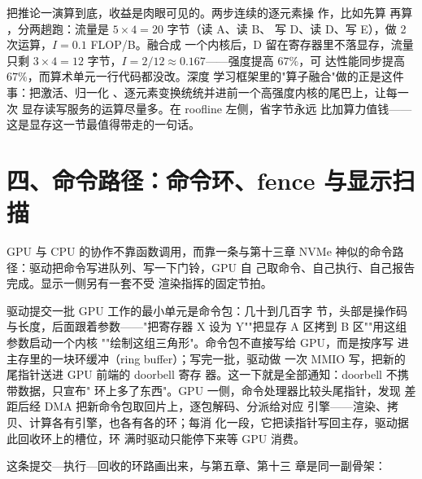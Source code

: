 把推论一演算到底，收益是肉眼可见的。两步连续的逐元素操
作，比如先算  再算 ，分两趟跑：流量是 $5\times4=20$ 字节（读 A、读 B、
写 D、读 D、写 E），做 2 次运算，$I=0.1$ FLOP/B。融合成
一个内核后，D 留在寄存器里不落显存，流量只剩 $3\times4
=12$ 字节，$I=2/12\approx0.167$——强度提高 $67\%$，可
达性能同步提高 $67\%$，而算术单元一行代码都没改。深度
学习框架里的"算子融合"做的正是这件事：把激活、归一化
、逐元素变换统统并进前一个高强度内核的尾巴上，让每一次
显存读写服务的运算尽量多。在 roofline 左侧，省字节永远
比加算力值钱——这是显存这一节最值得带走的一句话。

\section{四、命令路径：命令环、fence 与显示扫描}

GPU 与 CPU 的协作不靠函数调用，而靠一条与第十三章 NVMe
神似的命令路径：驱动把命令写进队列、写一下门铃，GPU 自
己取命令、自己执行、自己报告完成。显示一侧另有一套不受
渲染指挥的固定节拍。

驱动提交一批 GPU 工作的最小单元是命令包：几十到几百字
节，头部是操作码与长度，后面跟着参数——"把寄存器 X
设为 Y""把显存 A 区拷到 B 区""用这组参数启动一个内核
""绘制这组三角形"。命令包不直接写给 GPU，而是按序写
进主存里的一块环缓冲（ring buffer）；写完一批，驱动做
一次 MMIO 写，把新的尾指针送进 GPU 前端的 doorbell 寄存
器。这一下就是全部通知：doorbell 不携带数据，只宣布"
环上多了东西"。GPU 一侧，命令处理器比较头尾指针，发现
差距后经 DMA 把新命令包取回片上，逐包解码、分派给对应
引擎——渲染、拷贝、计算各有引擎，也各有各的环；每消
化一段，它把读指针写回主存，驱动据此回收环上的槽位，环
满时驱动只能停下来等 GPU 消费。

这条提交—执行—回收的环路画出来，与第五章、第十三
章是同一副骨架：

